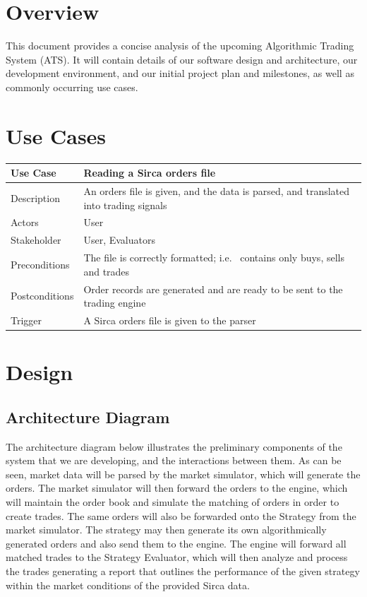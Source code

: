 \documentclass{article}
\begin{document}
\maketitle


\section{Overview}
This document provides a concise analysis of the upcoming Algorithmic Trading System (ATS). It will contain details of our software design and architecture, our development environment, and our initial project plan and milestones, as well as commonly occurring use cases.


\section{Use Cases}

\begin{tabular}{|p{1in}|p{3in}|}
\hline
Use Case & Reading a Sirca orders file\\\hline
Description & An orders file is given, and the data is parsed, and translated into trading signals\\
Actors & User\\
Stakeholder & User, Evaluators\\
Preconditions & The file is correctly formatted; i.e. \ contains only buys, sells and trades\\
Postconditions & Order records are generated and are ready to be sent to the trading engine\\
Trigger & A Sirca orders file is given to the parser\\
\hline
\end{tabular}


\section{Design}
\subsection{Architecture Diagram}

The architecture diagram below illustrates the preliminary components of the system that we are developing, and the interactions between them. As can be seen, market data will be parsed by the market simulator, which will generate the orders. The market simulator will then forward the orders to the engine, which will maintain the order book and simulate the matching of orders in order to create trades. The same orders will also be forwarded onto the Strategy from the market simulator. The strategy may then generate its own algorithmically generated orders and also send them to the engine. The engine will forward all matched trades to the Strategy Evaluator, which will then analyze and process the trades generating a report that outlines the performance of the given strategy within the market conditions of the provided Sirca data.
\end{document}
